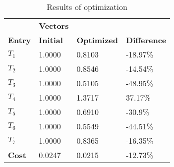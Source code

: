 \begin{table}[H]
\centering
\begin{tabular}{llll}
\textbf{}      & \cellcolor[HTML]{EFEFEF}\textbf{Vectors} & \textbf{} & \textbf{}         \\
\rowcolor[HTML]{EFEFEF} 
\textbf{Entry} & \textbf{Initial} & \textbf{Optimized} & \textbf{Difference} \\
$T_1$ & 1.0000 & 0.8103 & -18.97\% \\ 
$T_2$ & 1.0000 & 0.8546 & -14.54\% \\ 
$T_3$ & 1.0000 & 0.5105 & -48.95\% \\ 
$T_4$ & 1.0000 & 1.3717 & 37.17\% \\ 
$T_5$ & 1.0000 & 0.6910 & -30.9\% \\ 
$T_6$ & 1.0000 & 0.5549 & -44.51\% \\ 
$T_7$ & 1.0000 & 0.8365 & -16.35\% \\ 
\rowcolor[HTML]{EFEFEF} 
\textbf{Cost}  & 0.0247 & 0.0215 & -12.73\% \\ 
\end{tabular}
\caption{Results of optimization}
\label{tab:OptimizationAnalysis}
\end{table}